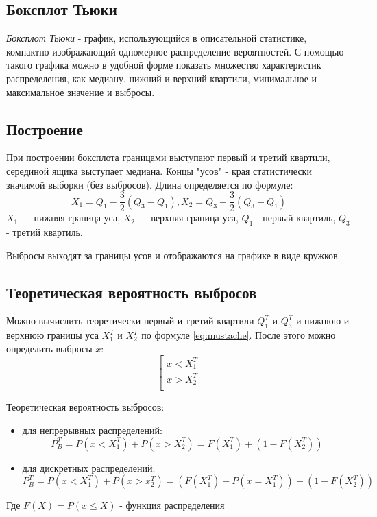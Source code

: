 \documentclass[12pt,a4paper]{article}
\begin{document}
\subsection{Боксплот Тьюки}
\textit{Боксплот Тьюки} - график, использующийся в описательной статистике, компактно изображающий одномерное распределение вероятностей. С помощью такого графика можно в удобной форме показать множество характеристик распределения, как медиану, нижний и верхний квартили, минимальное и максимальное значение и выбросы.

\subsection{Построение}
При построении боксплота границами выступают первый и третий квартили, серединой ящика выступает медиана. Концы "усов" - края статистически значимой выборки (без выбросов). Длина определяется по формуле:
        \begin{equation}
            X_1 = Q_1 - \frac{3}{2}(Q_3 - Q_1), X_2 = Q_3 + \frac{3}{2}(Q_3 - Q_1)
        \label{eq:mustache}
        \end{equation}
$X_1$ — нижняя граница уса, $X_2$ — верхняя граница уса, $Q_1$ - первый квартиль, $Q_3$ - третий квартиль.

Выбросы выходят за границы усов и отображаются на графике в виде кружков

\subsection{Теоретическая вероятность выбросов}
Можно вычислить теоретически первый и третий квартили $Q_1^T$ и $Q_3^T$ и нижнюю и верхнюю границы уса $X_1^T$ и $X_2^T$ по формуле \eqref{eq:mustache}. После этого можно определить выбросы $x:$
\begin{equation}
	\left[
	\begin{array}{ll}
        x<X_1^T\\
		x>X_2^T\\
	\end{array}
    \right.
\end{equation}

Теоретическая вероятность выбросов:
\begin{itemize}
    \item для непрерывных распределений:
        \begin{equation}
		    P_B^T=P(x<X_1^T)+P(x>X_2^T)=F(X_1^T)+(1-F(X_2^T))
	    \end{equation}
	\item для дискретных распределений:
	    \begin{equation}
		    P_B^T=P(x<X_1^T)+P(x>x_2^T)=(F(X_1^T)-P(x=X_1^T))+(1-F(X_2^T))
	    \end{equation}
\end{itemize}
Где $F(X)=P(x\leq{X})$ - функция распределения
\end{document}

